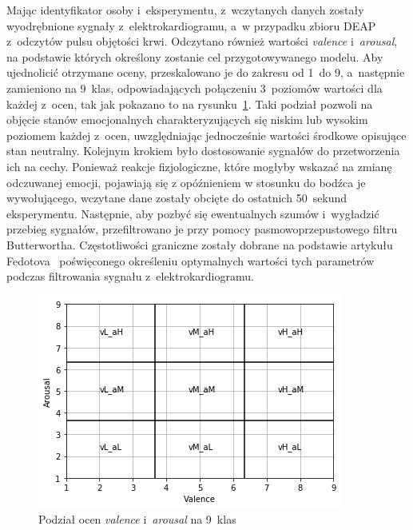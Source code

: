 Mając identyfikator osoby i~eksperymentu, z~wczytanych danych zostały wyodrębnione sygnały z~elektrokardiogramu, a~w przypadku zbioru DEAP z~odczytów pulsu objętości krwi. Odczytano również wartości \textit{valence} i~\textit{arousal}, na podstawie których określony zostanie cel przygotowywanego modelu. Aby ujednolicić otrzymane oceny, przeskalowano je do zakresu od 1~do 9, a~następnie zamieniono na 9~klas, odpowiadających połączeniu 3~poziomów wartości dla każdej z~ocen, tak jak pokazano to na rysunku~\ref{fig:model_classes}. Taki podział pozwoli na objęcie stanów emocjonalnych charakteryzujących się niskim lub wysokim poziomem każdej z~ocen, uwzględniając jednocześnie wartości środkowe opisujące stan neutralny. Kolejnym krokiem było dostosowanie sygnałów do przetworzenia ich na cechy. Ponieważ reakcje fizjologiczne, które mogłyby wskazać na zmianę odczuwanej emocji, pojawiają się z opóźnieniem w stosunku do bodźca je wywołującego, wczytane dane zostały obcięte do ostatnich 50~sekund eksperymentu. Następnie, aby pozbyć się ewentualnych szumów i~wygładzić przebieg sygnałów, przefiltrowano je przy pomocy pasmowoprzepustowego filtru Butterwortha. Częstotliwości graniczne zostały dobrane na podstawie artykułu Fedotova~\cite{fedotov_optimal_cutoff_2016} poświęconego określeniu optymalnych wartości tych parametrów podczas filtrowania sygnału z~elektrokardiogramu.
\begin{figure}
	\centering
	\includegraphics[width=0.5\linewidth]{images/model_classes.png}
	\caption{Podział ocen \textit{valence} i~\textit{arousal} na 9~klas}
	\label{fig:model_classes}
\end{figure}

